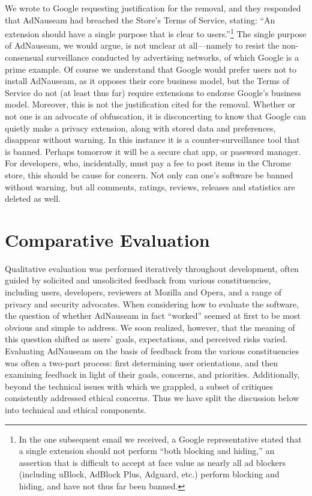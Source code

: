 \documentclass[conference]{IEEEtran}
\begin{document}
We wrote to Google requesting justification for the removal, and they responded that AdNauseam had breached the Store's Terms of Service, stating: “An extension should have a single purpose that is clear to users.”\footnote{In the one subsequent email we received, a Google representative stated that a single extension should not perform “both blocking and hiding,” an assertion that is difficult to accept at face value as nearly all ad blockers (including uBlock, AdBlock Plus, Adguard, etc.) perform blocking and hiding, and have not thus far been banned.} The single purpose of AdNauseam, we would argue, is not unclear at all---namely to resist the non-consensual surveillance conducted by advertising networks, of which Google is a prime example. Of course we understand that Google would prefer users not to install AdNauseam, as it opposes their core business model, but the Terms of Service do not (at least thus far) require extensions to endorse Google's business model. Moreover, this is not the justification cited for the removal. Whether or not one is an advocate of obfuscation, it is disconcerting to know that Google can quietly make a privacy extension, along with stored data and preferences, disappear without warning. In this instance it is a counter-surveillance tool that is banned. Perhaps tomorrow it will be a secure chat app, or password manager. For developers, who, incidentally, must pay a fee to post items in the Chrome store, this should be cause for concern. Not only can one's software be banned without warning, but all comments, ratings, reviews, releases and statistics are deleted as well.


\section{Comparative Evaluation}

Qualitative evaluation was performed iteratively throughout development, often guided by solicited and unsolicited feedback from various constituencies, including users, developers, reviewers at Mozilla and Opera, and a range of privacy and security advocates. When considering how to evaluate the software, the question of whether AdNauseam in fact “worked” seemed at first to be most obvious and simple to address. We soon realized, however, that the meaning of this question shifted as users' goals, expectations, and perceived risks varied. Evaluating AdNauseam on the basis of feedback from the various constituencies was often a two-part process: first determining user orientations, and then examining feedback in light of their goals, concerns, and priorities. Additionally, beyond the technical issues with which we grappled, a subset of critiques consistently addressed ethical concerns. Thus we have split the discussion below into technical and ethical components.
\end{document}

